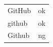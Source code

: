 \documentclass[preview]{standalone}
\newcommand{\tA}[1]{\textcolor{cA}{#1}}
\newcommand{\tD}[1]{\textcolor{cD}{#1}}
\begin{document}
\begin{table}[H]
	\centering
	\begin{tabular}{ll}
		GitHub & \tA{ok} \\
		github & \tA{ok} \\
		Github & \tD{ng} \\
	\end{tabular}
\end{table}
\end{document}
